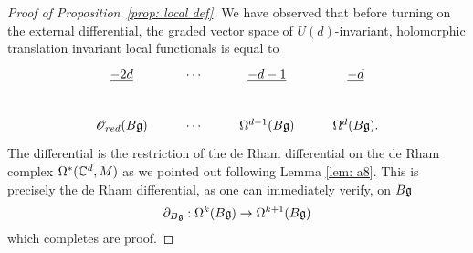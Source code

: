 \begin{proof}[Proof of Proposition~\ref{prop: local def}]
We have observed that before turning on the external differential, the graded vector space of $U(d)$-invariant, holomorphic translation invariant local functionals is equal to
\[
\label{bg def complex1}
\xymatrix{
\ul{-2d} & \cdots & \ul{-d-1} & \ul{-d} \\
\sO_{red}(B \fg) & \cdots & \Omega^{d-1} (B \fg) & \Omega^{d}(B \fg) .
}
\]
The differential is the restriction of the de Rham differential on the de Rham complex $\Omega^*(\mathbb C^d, M)$ as we pointed out following Lemma \ref{lem: a8}. 
This is precisely the de Rham differential, as one can immediately verify, on $B \mathfrak g$ 
\[
\partial_{B \mathfrak g} : \Omega^k(B \mathfrak g) \to \Omega^{k+1} (B \mathfrak g)
\]
which completes are proof. 
\end{proof} 

